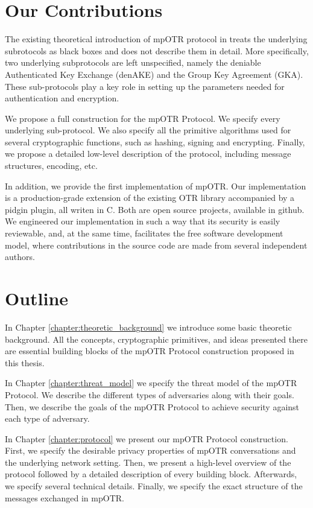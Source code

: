 \section{Our Contributions}
The existing theoretical introduction of mpOTR protocol in \cite{mpotr} treats the underlying subrotocols as black boxes and does not describe them in detail. More specifically, two underlying subprotocols are left unspecified, namely the deniable Authenticated Key Exchange (denAKE) and the Group Key Agreement (GKA). These sub-protocols play a key role in setting up the parameters needed for authentication and encryption.

We propose a full construction for the mpOTR Protocol. We specify every underlying sub-protocol. We also specify all the primitive algorithms used for several cryptographic functions, such as hashing, signing and encrypting. Finally, we propose a detailed low-level description of the protocol, including message structures, encoding, etc.

In addition, we provide the first implementation of mpOTR. Our implementation is a production-grade extension of the existing OTR library accompanied by a pidgin plugin, all writen in C. Both are open source projects, available in github. We engineered our implementation in such a way that its security is easily reviewable, and, at the same time, facilitates the free software development model, where contributions in the source code are made from several independent authors.

\section{Outline}
In Chapter \ref{chapter:theoretic_background} we introduce some basic theoretic background. All the concepts, cryptographic primitives, and ideas presented there are essential building blocks of the mpOTR Protocol construction proposed in this thesis.

In Chapter \ref{chapter:threat_model} we specify the threat model of the mpOTR Protocol. We describe the different types of adversaries along with their goals. Then, we describe the goals of the mpOTR Protocol to achieve security against each type of adversary.

In Chapter \ref{chapter:protocol} we present our mpOTR Protocol construction. First, we specify the desirable privacy properties of mpOTR conversations and the underlying network setting. Then, we present a high-level overview of the protocol followed by a detailed description of every building block. Afterwards, we specify several technical details. Finally, we specify the exact structure of the messages exchanged in mpOTR.

